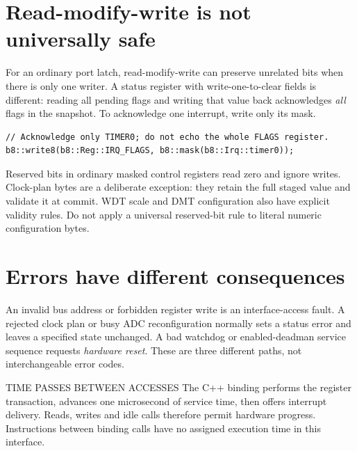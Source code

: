 \documentclass[10pt]{article}
\begin{document}
\section*{Read-modify-write is not universally safe}
For an ordinary port latch, read-modify-write can preserve unrelated bits when there is only one writer. A status register with write-one-to-clear fields is different: reading all pending flags and writing that value back acknowledges \emph{all} flags in the snapshot. To acknowledge one interrupt, write only its mask.
\begin{verbatim}
// Acknowledge only TIMER0; do not echo the whole FLAGS register.
b8::write8(b8::Reg::IRQ_FLAGS, b8::mask(b8::Irq::timer0));
\end{verbatim}
Reserved bits in ordinary masked control registers read zero and ignore writes. Clock-plan bytes are a deliberate exception: they retain the full staged value and validate it at commit. WDT scale and DMT configuration also have explicit validity rules. Do not apply a universal reserved-bit rule to literal numeric configuration bytes.
\section*{Errors have different consequences}
An invalid bus address or forbidden register write is an interface-access fault. A rejected clock plan or busy ADC reconfiguration normally sets a status error and leaves a specified state unchanged. A bad watchdog or enabled-deadman service sequence requests \emph{hardware reset}. These are three different paths, not interchangeable error codes.
\begin{Notice}{TIME PASSES BETWEEN ACCESSES}
The C++ binding performs the register transaction, advances one microsecond of service time, then offers interrupt delivery. Reads, writes and idle calls therefore permit hardware progress. Instructions between binding calls have no assigned execution time in this interface.
\end{Notice}
\end{document}
